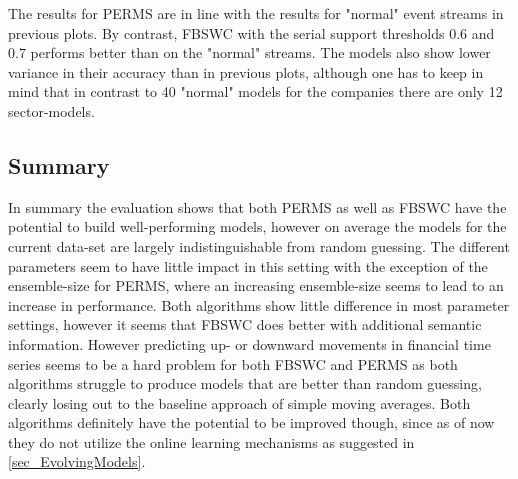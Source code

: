 The results for PERMS are in line with the results for "normal" event streams in previous plots. By contrast, FBSWC with the serial support thresholds $0.6$ and $0.7$ performs better than on the "normal" streams. The models also show lower variance in their accuracy than in previous plots, although one has to keep in mind that in contrast to 40 "normal" models for the companies there are only 12 sector-models.

\subsection{Summary}
In summary the evaluation shows that both PERMS as well as FBSWC have the potential to build well-performing models, however on average the models for the current data-set are largely indistinguishable from random guessing. The different parameters seem to have little impact in this setting with the exception of the ensemble-size for PERMS, where an increasing ensemble-size seems to lead to an increase in performance. Both algorithms show little difference in most parameter settings, however it seems that FBSWC does better with additional semantic information. However predicting up- or downward movements in financial time series seems to be a hard problem for both FBSWC and PERMS as both algorithms struggle to produce models that are better than random guessing, clearly losing out to the baseline approach of simple moving averages. Both algorithms definitely have the potential to be improved though, since as of now they do not utilize the online learning mechanisms as suggested in \ref{sec_EvolvingModels}.